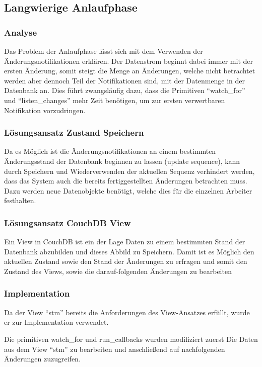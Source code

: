 \subsection{Langwierige Anlaufphase}
\subsubsection{Analyse}
Das Problem der Anlaufphase lässt sich mit dem Verwenden der Änderungsnotifikationen erklären. Der Datenstrom beginnt dabei immer mit der ersten Änderung,
somit steigt die Menge an Änderungen, welche nicht betrachtet werden aber dennoch Teil der Notifikationen sind, mit der Datenmenge in der Datenbank an.
Dies führt zwangsläufig dazu, dass die Primitiven ``watch\_for'' und ``listen\_changes'' mehr Zeit benötigen, um zur ersten verwertbaren Notifikation vorzudringen.


\subsubsection{Lösungsansatz Zustand Speichern}
Da es Möglich ist die Änderungsnotifikationen an einem bestimmten Änderungsstand der 
Datenbank beginnen zu lassen (update sequence),
kann durch Speichern und Wiederverwenden der aktuellen Sequenz verhindert werden,
dass das System auch die bereits fertiggestellten Änderungen betrachten muss.
Dazu werden neue Datenobjekte benötigt, welche dies für die einzelnen Arbeiter festhalten.


\subsubsection{Lösungsansatz CouchDB View}
Ein View in CouchDB ist ein der Lage Daten zu einem bestimmten Stand der Datenbank abzubilden und dieses Abbild zu Speichern.
Damit ist es Möglich den aktuellen Zustand sowie den Stand der Änderungen zu erfragen und somit den Zustand des Views, sowie die darauf-folgenden Änderungen zu bearbeiten 

\subsubsection{Implementation}
Da der View ``stm'' bereits die Anforderungen des View-Ansatzes erfüllt,
wurde er zur Implementation verwendet.

Die primitiven watch\_for und run\_callbacks wurden modifiziert zuerst
Die Daten aus dem View ``stm'' zu bearbeiten und anschließend 
auf nachfolgenden Änderungen zuzugreifen.

